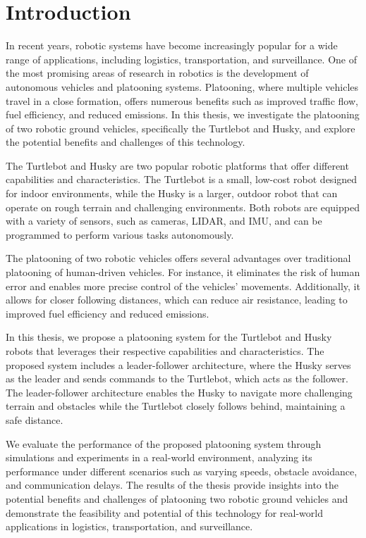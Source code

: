 \chapter{Introduction}



In recent years, robotic systems have become increasingly popular for a wide range of applications, including logistics, transportation, and surveillance. One of the most promising areas of research in robotics is the development of autonomous vehicles and platooning systems. Platooning, where multiple vehicles travel in a close formation, offers numerous benefits such as improved traffic flow, fuel efficiency, and reduced emissions. In this thesis, we investigate the platooning of two robotic ground vehicles, specifically the Turtlebot and Husky, and explore the potential benefits and challenges of this technology.

The Turtlebot and Husky are two popular robotic platforms that offer different capabilities and characteristics. The Turtlebot is a small, low-cost robot designed for indoor environments, while the Husky is a larger, outdoor robot that can operate on rough terrain and challenging environments. Both robots are equipped with a variety of sensors, such as cameras, LIDAR, and IMU, and can be programmed to perform various tasks autonomously.

The platooning of two robotic vehicles offers several advantages over traditional platooning of human-driven vehicles. For instance, it eliminates the risk of human error and enables more precise control of the vehicles' movements. Additionally, it allows for closer following distances, which can reduce air resistance, leading to improved fuel efficiency and reduced emissions.

In this thesis, we propose a platooning system for the Turtlebot and Husky robots that leverages their respective capabilities and characteristics. The proposed system includes a leader-follower architecture, where the Husky serves as the leader and sends commands to the Turtlebot, which acts as the follower. The leader-follower architecture enables the Husky to navigate more challenging terrain and obstacles while the Turtlebot closely follows behind, maintaining a safe distance.

We evaluate the performance of the proposed platooning system through simulations and experiments in a real-world environment, analyzing its performance under different scenarios such as varying speeds, obstacle avoidance, and communication delays. The results of the thesis provide insights into the potential benefits and challenges of platooning two robotic ground vehicles and demonstrate the feasibility and potential of this technology for real-world applications in logistics, transportation, and surveillance.

